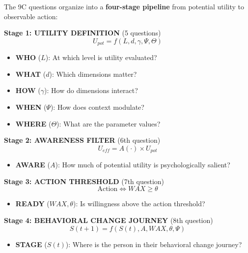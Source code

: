 The 9C questions organize into a \textbf{four-stage pipeline} from potential
utility to observable action:

\begin{tcolorbox}[colback=blue!5!white, colframe=blue!75!black,
    title=\textbf{The EBF Pipeline: From Utility to Behavioral Change}]

\textbf{Stage 1: UTILITY DEFINITION} (5 questions)
\begin{equation}
U_{pot} = f(L, d, \gamma, \Psi, \Theta)
\end{equation}
\begin{itemize}[nosep]
\item \textbf{WHO} ($L$): At which level is utility evaluated?
\item \textbf{WHAT} ($d$): Which dimensions matter?
\item \textbf{HOW} ($\gamma$): How do dimensions interact?
\item \textbf{WHEN} ($\Psi$): How does context modulate?
\item \textbf{WHERE} ($\Theta$): What are the parameter values?
\end{itemize}

\vspace{0.3cm}
\textbf{Stage 2: AWARENESS FILTER} (6th question)
\begin{equation}
U_{eff} = A(\cdot) \times U_{pot}
\end{equation}
\begin{itemize}[nosep]
\item \textbf{AWARE} ($A$): How much of potential utility is psychologically salient?
\end{itemize}

\vspace{0.3cm}
\textbf{Stage 3: ACTION THRESHOLD} (7th question)
\begin{equation}
\text{Action} \Leftrightarrow WAX \geq \theta
\end{equation}
\begin{itemize}[nosep]
\item \textbf{READY} ($WAX, \theta$): Is willingness above the action threshold?
\end{itemize}

\vspace{0.3cm}
\textbf{Stage 4: BEHAVIORAL CHANGE JOURNEY} (8th question)
\begin{equation}
S(t+1) = f(S(t), A, WAX, \theta, \Psi)
\end{equation}
\begin{itemize}[nosep]
\item \textbf{STAGE} ($S(t)$): Where is the person in their behavioral change journey?
\end{itemize}

\end{tcolorbox}

